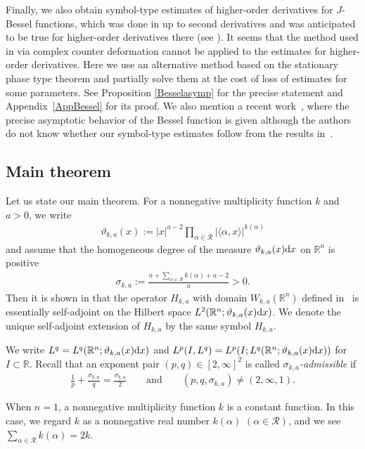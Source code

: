 \documentclass[10pt,a4paper]{amsart}
\numberwithin{equation}{section}
\def\R{\mathbb{R}}%
\def\s{\sigma}
\newcommand{\cR}{\mathcal{R}}
\begin{document}
Finally, we also obtain symbol-type estimates of higher-order derivatives for $J$-Bessel functions, which was done in \cite{IJ} up to second derivatives and was anticipated to be true for higher-order derivatives there (see \cite[Remark after Theorem 9.1]{IJ}). It seems that the method used in \cite{IJ} via complex counter deformation cannot be applied to the estimates for higher-order derivatives. Here we use an alternative method based on the stationary phase type theorem and partially solve them at the cost of loss of estimates for some parameters.
See Proposition \ref{Besselasymp} for the precise statement and Appendix~\ref{AppBessel} for its proof. We also mention a recent work~\cite{Sh}, where the precise asymptotic behavior of the Bessel function is given although the authors do not know whether our symbol-type estimates follow from the results in~\cite{Sh}.

\subsection{Main theorem}
Let us state our main theorem.
For a nonnegative multiplicity function $k$ and $a>0$, we write
\begin{align}\label{vartheta}
\vartheta_{k,a}(x):=|x|^{a-2}\prod_{\alpha\in\cR}|\langle\alpha,x\rangle|^{k(\alpha)}
\end{align}
and assume that the homogeneous degree of the measure $\vartheta_{k,a}(x){\rm d}x$ on $\R^n$ is positive
\begin{align}\label{eq:positive}
\sigma_{k,a}:=\frac{n+\sum_{\alpha\in\cR}k(\alpha)+a-2}{a}>0.
\end{align}
Then it is shown in \cite[Corollary 3.22]{BKO} that the operator $H_{k,a}$ with domain $W_{k,a}(\R^n)$ defined in~\cite[equation~(3.29)]{BKO} is essentially self-adjoint on the Hilbert space $L^2(\R^n; \vartheta_{k,a}(x) {\rm d}x)$. We denote the unique self-adjoint extension of $H_{k,a}$ by the same symbol $H_{k,a}$.

We write $L^q=L^q(\R^n;\vartheta_{k,a}(x){\rm d}x )$ and $L^p(I, L^q)=L^p(I; L^q(\R^n;\vartheta_{k,a}(x){\rm d}x ))$ for $I\subset \R$.
Recall that an exponent pair $(p,q)\in[2,\infty]^2$ is called \emph{$\sigma_{k,a}$-admissible} if
\begin{align*}%
\frac{1}{p}+\frac{\s_{k,a}}{q}=\frac{\s_{k,a}}{2} \qquad \text{and}\qquad (p,q,\s_{k,a})\neq (2,\infty,1).
\end{align*}

When $n=1$, a nonnegative multiplicity function $k$ is a constant function.
In this case, we regard $k$ as a nonnegative real number $k(\alpha)$ $(\alpha\in\cR)$, and we see $\sum_{\alpha\in\cR}k(\alpha)=2k$.
\end{document}
